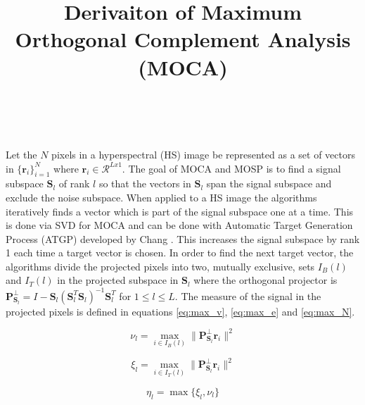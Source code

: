 \documentclass[paper=a4, fontsize=11pt]{article} %
\title{	
\normalfont \normalsize 
\Large Derivaiton of Maximum Orthogonal Complement Analysis (MOCA) \\
\vspace{5mm}
\horrule{2pt} \\[0.5cm] %
}
\begin{document}
\date{}

\maketitle %

\vspace{-30mm}

\subsection*{}
Let the \(N\) pixels in a hyperspectral (HS) image be represented as a set of vectors in \(\{\textbf{r}_i\}_{i=1}^N\) where \(\textbf{r}_i \in \mathcal{R}^{Lx1}\). The goal of MOCA and MOSP \cite{mosp, moca, chang} is to find a signal subspace \(\textbf{S}_l\) of rank \(l\) so that the vectors in \(\textbf{S}_l\) span the signal subspace and exclude the noise subspace. When applied to a HS image the algorithms iteratively finds a vector which is part of the signal subspace one at a time. This is done via SVD for MOCA and can be done with Automatic Target Generation Process (ATGP) developed by Chang \cite{chang}. This increases the signal subspace by rank 1 each time a target vector is chosen. In order to find the next target vector, the algorithms divide the projected pixels into two, mutually exclusive, sets \(I_{B}(l)\) and \(I_{T}(l)\) in the projected subspace in \(\textbf{S}_l\) where the orthogonal projector is \(\textbf{P}_{{\textbf{S}}_{l}}^{\perp} = I - \textbf{S}_l\left(\textbf{S}_l^T\textbf{S}_l\right)^{-1}\textbf{S}_l^T\) for \(1 \le l \le L\). The measure of the signal in the projected pixels is defined in equations \ref{eq:max_v}, \ref{eq:max_e} and \ref{eq:max_N}.

\begin{equation}
\label{eq:max_v}
\nu_l = \max_{i\in I_{B}(l)} \|\textbf{P}_{\textbf{S}_l}^{\perp}\textbf{r}_i\|^2
\end{equation}

\begin{equation}
\label{eq:max_e}
\xi_l = \max_{i\in I_{T}(l)} \|\textbf{P}_{\textbf{S}_l}^{\perp}\textbf{r}_i\|^2
\end{equation}

\begin{equation}
\label{eq:max_N}
\eta_l = \max\{\xi_l, \nu_l\}
\end{equation}

\vspace{2mm}
\end{document}
